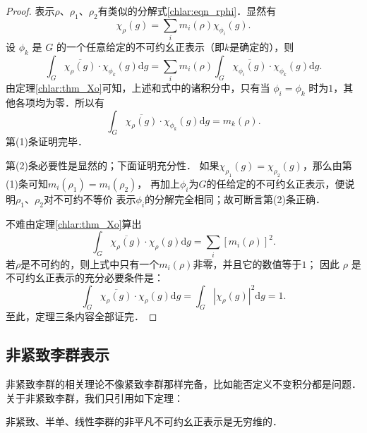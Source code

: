 \begin{proof}
	表示$\rho$、$\rho_1$、$\rho_2$有类似的分解式\eqref{chlar:eqn_rphi}．显然有
	\begin{equation*}
		\chi_\rho(g)=\sum_{i} m_i(\rho) \chi_{\phi_i}(g) .
	\end{equation*}
	设 $\phi_k$ 是 $G$ 的一个任意给定的不可约幺正表示（即$k$是确定的），则
	\begin{equation*}
		\int_G \overline{\chi_\rho(g)} \cdot \chi_{\phi_k}(g) \mathrm{d} g
		=\sum_{i} m_i(\rho) \int_G \overline{\chi_{\phi_i}(g)} \cdot \chi_{\phi_k}(g) \mathrm{d} g.
	\end{equation*}
	由定理\ref{chlar:thm_Xo}可知，上述和式中的诸积分中，只有当 $\phi_i=\phi_k$ 时为$1$，其他各项均为零．所以有
	\begin{equation*}
		\int_G \overline{\chi_\rho(g)} \cdot \chi_{\phi_k}(g) \mathrm{d} g=m_k(\rho).
	\end{equation*}
	第(1)条证明完毕．
	
	第(2)条必要性是显然的；下面证明充分性．
	如果$\chi_{\rho_1}(g)=\chi_{\rho_2}(g)$，那么由第(1)条可知$m_i(\rho_1)=m_i(\rho_2)$，
	再加上$\phi_i$为$G$的任给定的不可约幺正表示，便说明$\rho_1$、$\rho_2$对不可约不等价
	表示$\phi_i$的分解完全相同；故可断言第(2)条正确．
	
	不难由定理\ref{chlar:thm_Xo}算出
	\begin{equation}
		\int_G \overline{\chi_\rho(g)} \cdot \chi_\rho(g) \mathrm{d} g	=\sum_{i}[m_i(\rho)]^2.
	\end{equation}
	若$\rho$是不可约的，则上式中只有一个$m_i(\rho)$非零，并且它的数值等于$1$；
	因此 $\rho$ 是不可约幺正表示的充分必要条件是：
	\begin{equation*}
		\int_G \overline{\chi_\rho(g)} \cdot \chi_\rho(g) \mathrm{d} g
		=\int_G\left|\chi_\rho(g)\right|^2 \mathrm{d} g=1.
	\end{equation*}
	至此，定理三条内容全部证完．
\end{proof}



\subsection{非紧致李群表示}
非紧致李群的相关理论不像紧致李群那样完备，比如能否定义不变积分都是问题．
关于非紧致李群，我们只引用如下定理\cite[p.163]{huangjs-2000}：
\begin{theorem}\label{chlar:thm_IFU}
	非紧致、半单、线性李群的非平凡不可约幺正表示是无穷维的．
\end{theorem}




